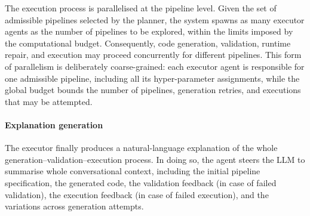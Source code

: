 \documentclass[runningheads]{llncs}
\newenvironment{inlinelist}{\begin{enumerate*}[label=\emph{(\roman*)}]}{\end{enumerate*}}
\begin{document}
The execution process is parallelised at the pipeline level.
%
Given the set of admissible pipelines selected by the planner,
the system spawns as many executor agents as the number of pipelines to be explored,
within the limits imposed by the computational budget.
%
Consequently,
code generation,
validation,
runtime repair,
and execution may proceed concurrently for different pipelines.
%
This form of parallelism is deliberately coarse-grained:
each executor agent is responsible for one admissible pipeline,
including all its hyper-parameter assignments,
while the global budget bounds the number of pipelines,
generation retries,
and executions that may be attempted.

\paragraph{Explanation generation}


The executor finally produces a natural-language explanation
of the whole generation--validation--execution process.
%
In doing so,
the agent steers the \ac{LLM} to summarise whole conversational context,
including the initial pipeline specification,
the generated code,
the validation feedback (in case of failed validation),
the execution feedback (in case of failed execution),
and the variations across generation attempts.

\end{document}
